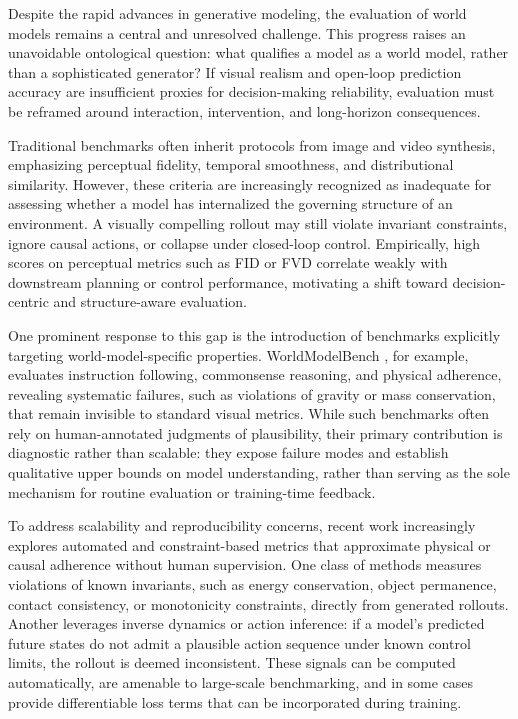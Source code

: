 \documentclass[pdflatex,sn-mathphys-num]{sn-jnl}
\theoremstyle{thmstyleone}%
\theoremstyle{thmstyletwo}%
\theoremstyle{thmstylethree}%
\begin{document}
Despite the rapid advances in generative modeling, the evaluation of world models remains a central and unresolved challenge. This progress raises an unavoidable ontological question: what qualifies a model as a world model, rather than a sophisticated generator? If visual realism and open-loop prediction accuracy are insufficient proxies for decision-making reliability, evaluation must be reframed around interaction, intervention, and long-horizon consequences.

Traditional benchmarks often inherit protocols from image and video synthesis, emphasizing perceptual fidelity, temporal smoothness, and distributional similarity. However, these criteria are increasingly recognized as inadequate for assessing whether a model has internalized the governing structure of an environment. A visually compelling rollout may still violate invariant constraints, ignore causal actions, or collapse under closed-loop control. Empirically, high scores on perceptual metrics such as FID or FVD correlate weakly with downstream planning or control performance, motivating a shift toward decision-centric and structure-aware evaluation.

One prominent response to this gap is the introduction of benchmarks explicitly targeting world-model-specific properties. WorldModelBench \citep{worldmodelbench}, for example, evaluates instruction following, commonsense reasoning, and physical adherence, revealing systematic failures, such as violations of gravity or mass conservation, that remain invisible to standard visual metrics. While such benchmarks often rely on human-annotated judgments of plausibility, their primary contribution is diagnostic rather than scalable: they expose failure modes and establish qualitative upper bounds on model understanding, rather than serving as the sole mechanism for routine evaluation or training-time feedback.

To address scalability and reproducibility concerns, recent work increasingly explores automated and constraint-based metrics that approximate physical or causal adherence without human supervision. One class of methods measures violations of known invariants, such as energy conservation, object permanence, contact consistency, or monotonicity constraints, directly from generated rollouts. Another leverages inverse dynamics or action inference: if a model’s predicted future states do not admit a plausible action sequence under known control limits, the rollout is deemed inconsistent. These signals can be computed automatically, are amenable to large-scale benchmarking, and in some cases provide differentiable loss terms that can be incorporated during training.
\end{document}
